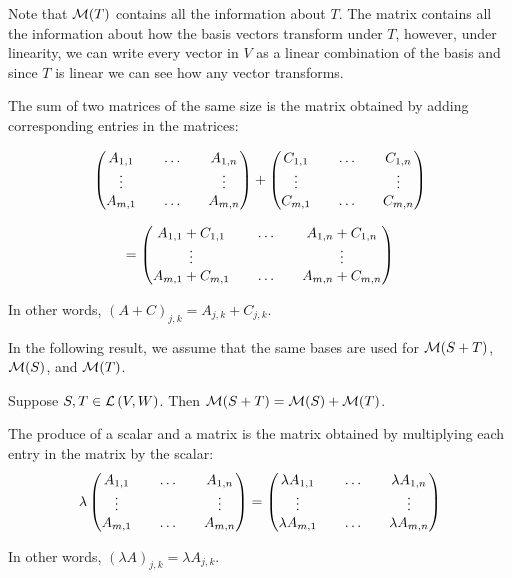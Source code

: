 Note that $\mathcal{M}(T)$ contains all the information about $T$.
The matrix contains all the information about how the
basis vectors transform under $T$, however, under linearity,
we can write every vector in $V$ as a linear combination of the basis
and since $T$ is linear we can see how any vector transforms.

\begin{definition} 
   The sum of two matrices of the same size is the matrix obtained
   by adding corresponding entries in the matrices:

   \[ \begin{pmatrix}
      A_{1,1} && \ldots && A_{1,n} \\
      \vdots && \empty && \vdots \\
      A_{m,1} && \dots && A_{m,n}
   \end{pmatrix}
   +
   \begin{pmatrix}
      C_{1,1} && \ldots && C_{1,n} \\
      \vdots && \empty && \vdots \\
      C_{m,1} && \dots && C_{m,n}
   \end{pmatrix} \]

   \[ = \begin{pmatrix}
      A_{1,1} + C_{1,1} && \ldots && A_{1,n} + C_{1,n}  \\
      \vdots && \empty && \vdots \\
      A_{m,1} + C_{m,1}  && \dots && A_{m,n} + C_{m,n}
   \end{pmatrix} \]
   
   In other words, $(A + C)_{j,k} = A_{j,k} + C_{j,k}$.
\end{definition}

In the following result, we assume that the same bases are used
for $\mathcal{M}(S+T)$, $\mathcal{M}(S)$, and $\mathcal{M}(T)$.

\begin{theorem} 
   Suppose $S,T \in \mathcal{L} \left( V, W \right)$. Then $\mathcal{M}(S+T) = \mathcal{M}(S) + \mathcal{M}(T)$.
\end{theorem}

\begin{definition} 
   The produce of a scalar and a matrix is the matrix
   obtained by multiplying each entry in the matrix by the scalar:
   \[ \lambda \begin{pmatrix}
      A_{1,1} && \ldots && A_{1,n} \\
      \vdots && \empty && \vdots \\
      A_{m,1} && \dots && A_{m,n}
   \end{pmatrix}
   =
   \begin{pmatrix}
      \lambda A_{1,1} && \ldots && \lambda A_{1,n} \\
      \vdots && \empty && \vdots \\
      \lambda A_{m,1} && \dots && \lambda A_{m,n}
   \end{pmatrix}
   \]

   In other words, $(\lambda A)_{j,k} = \lambda A_{j,k}$.
\end{definition}

